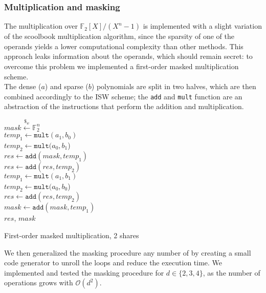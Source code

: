 \subsubsection*{\textbf{Multiplication and masking}}
The multiplication over $\mathds{F}_2[X]/(X^n-1)$ is implemented with a slight variation of the scoolbook multiplication algorithm, since the sparsity of one of the operands yields a lower computational complexity than other methods.
This approach leaks information about the operands, which should remain secret: to overcome this problem we implemented a first-order masked multiplication scheme.\\

The dense ($a$) and sparse ($b$) polynomials are split in two halves, which are then combined accordingly to the ISW scheme; the \texttt{add} and \texttt{mult} function are an abstraction of the instructions that perform the addition and multiplication.

\begin{algorithm}
    \SetAlgoLined
    \BlankLine
    \BlankLine

    $mask \xleftarrow{\mathdollar_w} \mathds{F}_2^n$\\

    $temp_1 \leftarrow \texttt{mult}(a_1, b_0)$\\
    $temp_2 \leftarrow \texttt{mult}(a_0, b_1$)\\

    $res \leftarrow \texttt{add}(mask, temp_1)$\\
    $res \leftarrow \texttt{add}(res, temp_2)$\\

    $temp_1 \leftarrow \texttt{mult}(a_1, b_1)$\\
    $temp_2 \leftarrow \texttt{mult}(a_0, b_0$)\\

    $res \leftarrow \texttt{add}(res, temp_2)$\\
    $mask \leftarrow \texttt{add}(mask, temp_1)$\\

    \Return$res$, $mask$    
    \caption{First-order masked multiplication, 2 shares}
\end{algorithm}

We then generalized the masking procedure any number of by creating a small code generator to unroll the loops and reduce the execution time. 
We implemented and tested the masking procedure for $d \in \lbrace 2, 3, 4\rbrace$, as the number of operations grows with $\mathcal{O}(d^2)$.